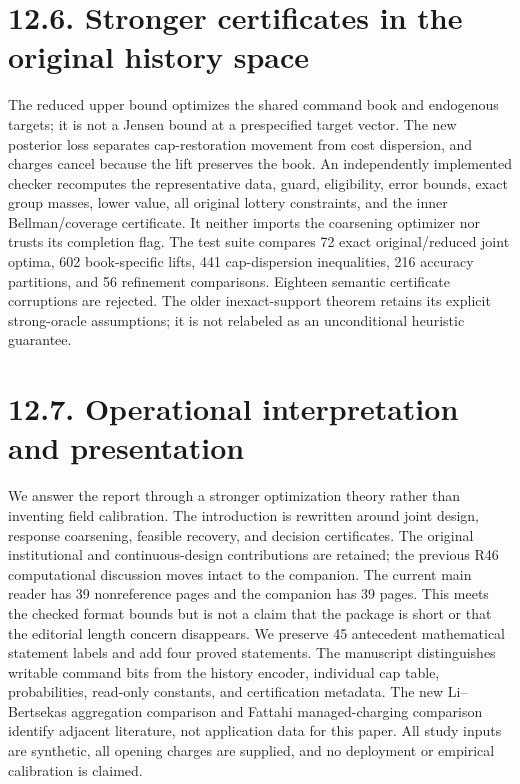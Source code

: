 \documentclass[11pt]{article}
\begin{document}
\section*{12.6. Stronger certificates in the original history space}
The reduced upper bound optimizes the shared command book and endogenous targets; it is not a Jensen bound at a prespecified target vector. The new posterior loss separates cap-restoration movement from cost dispersion, and charges cancel because the lift preserves the book. An independently implemented checker recomputes the representative data, guard, eligibility, error bounds, exact group masses, lower value, all original lottery constraints, and the inner Bellman/coverage certificate. It neither imports the coarsening optimizer nor trusts its completion flag. The test suite compares 72 exact original/reduced joint optima, 602 book-specific lifts, 441 cap-dispersion inequalities, 216 accuracy partitions, and 56 refinement comparisons. Eighteen semantic certificate corruptions are rejected. The older inexact-support theorem retains its explicit strong-oracle assumptions; it is not relabeled as an unconditional heuristic guarantee.

\section*{12.7. Operational interpretation and presentation}
We answer the report through a stronger optimization theory rather than inventing field calibration. The introduction is rewritten around joint design, response coarsening, feasible recovery, and decision certificates. The original institutional and continuous-design contributions are retained; the previous R46 computational discussion moves intact to the companion. The current main reader has 39 nonreference pages and the companion has 39 pages. This meets the checked format bounds but is not a claim that the package is short or that the editorial length concern disappears. We preserve 45 antecedent mathematical statement labels and add four proved statements. The manuscript distinguishes writable command bits from the history encoder, individual cap table, probabilities, read-only constants, and certification metadata. The new Li--Bertsekas aggregation comparison and Fattahi managed-charging comparison identify adjacent literature, not application data for this paper. All study inputs are synthetic, all opening charges are supplied, and no deployment or empirical calibration is claimed.
\end{document}
